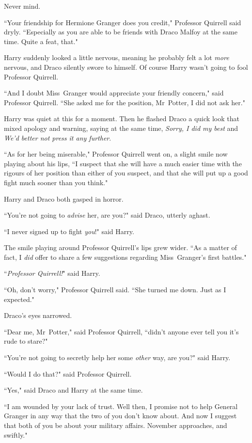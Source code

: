 Never mind.

``Your friendship for Hermione Granger does you credit," Professor Quirrell said dryly. ``Especially as you are able to be friends with Draco Malfoy at the same time. Quite a feat, that."

Harry suddenly looked a little nervous, meaning he probably felt a lot \emph{more} nervous, and Draco silently swore to himself. Of course Harry wasn't going to fool Professor Quirrell.

``And I doubt Miss~Granger would appreciate your friendly concern," said Professor Quirrell. ``She asked me for the position, Mr~Potter, I did not ask her."

Harry was quiet at this for a moment. Then he flashed Draco a quick look that mixed apology and warning, saying at the same time, \emph{Sorry, I did my best} and \emph{We'd better not press it any further}.

``As for her being miserable," Professor Quirrell went on, a slight smile now playing about his lips, ``I suspect that she will have a much easier time with the rigours of her position than either of you suspect, and that she will put up a good fight much sooner than you think."

Harry and Draco both gasped in horror.

``You're not going to \emph{advise} her, are you?" said Draco, utterly aghast.

``I never signed up to fight \emph{you}!" said Harry.

The smile playing around Professor Quirrell's lips grew wider. ``As a matter of fact, I \emph{did} offer to share a few suggestions regarding Miss~Granger's first battles."

``\emph{Professor Quirrell!}" said Harry.

``Oh, don't worry," Professor Quirrell said. ``She turned me down. Just as I expected."

Draco's eyes narrowed.

``Dear me, Mr~Potter," said Professor Quirrell, ``didn't anyone ever tell you it's rude to stare?"

``You're not going to secretly help her some \emph{other} way, are you?" said Harry.

``Would I do that?" said Professor Quirrell.

``Yes," said Draco and Harry at the same time.

``I am wounded by your lack of trust. Well then, I promise not to help General Granger in any way that the two of you don't know about. And now I suggest that both of you be about your military affairs. November approaches, and swiftly."

